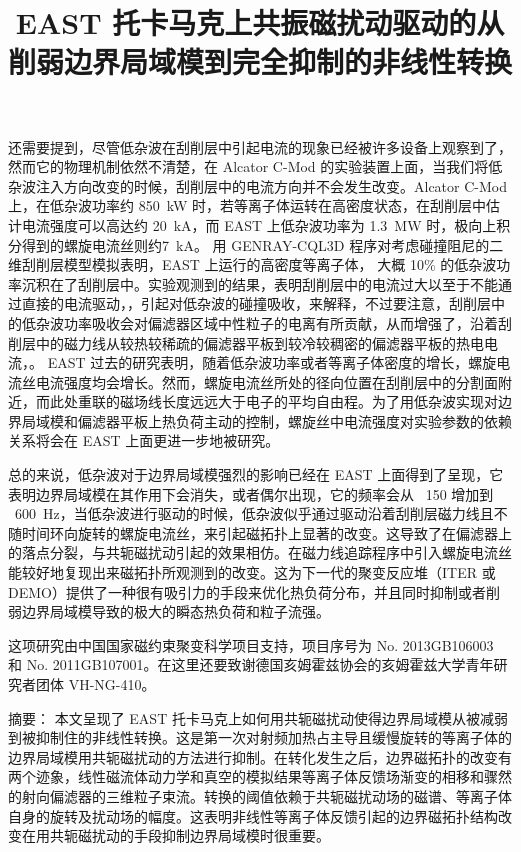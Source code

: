 还需要提到，尽管低杂波在刮削层中引起电流的现象已经被许多设备上观察到了，然而它的物理机制依然不清楚，在 Alcator C-Mod 的实验装置上面，当我们将低杂波注入方向改变的时候，刮削层中的电流方向并不会发生改变。Alcator C-Mod 上，在低杂波功率约 \SI{850}{\kilo\watt} 时，若等离子体运转在高密度状态，在刮削层中估计电流强度可以高达约 \SI{20}{\kilo\ampere}，而 EAST 上低杂波功率为 \SI{1.3}{\mega\watt} 时，极向上积分得到的螺旋电流丝则约\SI{7}{\kilo\ampere}。
用 GENRAY-CQL3D 程序对考虑碰撞阻尼的二维刮削层模型模拟表明，EAST 上运行的高密度等离子体， 大概 10\% 的低杂波功率沉积在了刮削层中。实验观测到的结果，表明刮削层中的电流过大以至于不能通过直接的电流驱动，，引起对低杂波的碰撞吸收，来解释，不过要注意，刮削层中的低杂波功率吸收会对偏滤器区域中性粒子的电离有所贡献，从而增强了，沿着刮削层中的磁力线从较热较稀疏的偏滤器平板到较冷较稠密的偏滤器平板的热电电流，。
EAST 过去的研究表明，随着低杂波功率或者等离子体密度的增长，螺旋电流丝电流强度均会增长。然而，螺旋电流丝所处的径向位置在刮削层中的分割面附近，而此处重联的磁场线长度远远大于电子的平均自由程。为了用低杂波实现对边界局域模和偏滤器平板上热负荷主动的控制，螺旋丝中电流强度对实验参数的依赖关系将会在 EAST 上面更进一步地被研究。

总的来说，低杂波对于边界局域模强烈的影响已经在 EAST 上面得到了呈现，它表明边界局域模在其作用下会消失，或者偶尔出现，它的频率会从 ~150 增加到 ~\SI{600}{\hertz}，当低杂波进行驱动的时候，低杂波似乎通过驱动沿着刮削层磁力线且不随时间环向旋转的螺旋电流丝，来引起磁拓扑上显著的改变。这导致了在偏滤器上的落点分裂，与共轭磁扰动引起的效果相仿。在磁力线追踪程序中引入螺旋电流丝能较好地复现出来磁拓扑所观测到的改变。这为下一代的聚变反应堆（ITER 或 DEMO）提供了一种很有吸引力的手段来优化热负荷分布，并且同时抑制或者削弱边界局域模导致的极大的瞬态热负荷和粒子流强。

这项研究由中国国家磁约束聚变科学项目支持，项目序号为 No. 2013GB106003 和 No. 2011GB107001。在这里还要致谢德国亥姆霍兹协会的亥姆霍兹大学青年研究者团体  VH-NG-410。



\title{EAST 托卡马克上共振磁扰动驱动的从削弱边界局域模到完全抑制的非线性转换}

{\heiti 摘要：} 本文呈现了 EAST 托卡马克上如何用共轭磁扰动使得边界局域模从被减弱到被抑制住的非线性转换。这是第一次对射频加热占主导且缓慢旋转的等离子体的边界局域模用共轭磁扰动的方法进行抑制。在转化发生之后，边界磁拓扑的改变有两个迹象，线性磁流体动力学和真空的模拟结果等离子体反馈场渐变的相移和骤然的射向偏滤器的三维粒子束流。转换的阈值依赖于共轭磁扰动场的磁谱、等离子体自身的旋转及扰动场的幅度。这表明非线性等离子体反馈引起的边界磁拓扑结构改变在用共轭磁扰动的手段抑制边界局域模时很重要。



